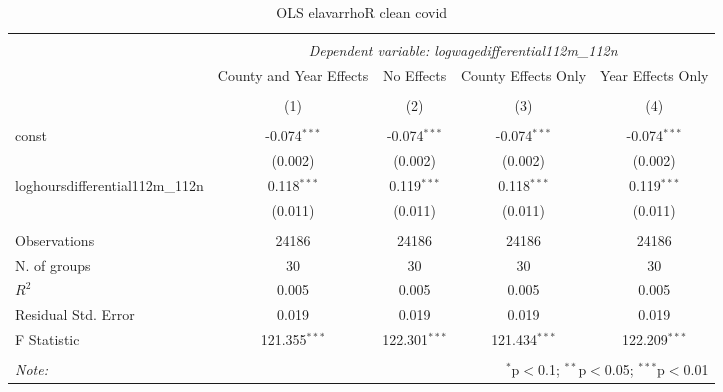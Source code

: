 \documentclass{report}
\begin{document}
\begin{table}[!htbp] \centering
  \caption{OLS elavarrhoR clean covid}
\begin{tabular}{@{\extracolsep{5pt}}lcccc}
\\[-1.8ex]\hline
\hline \\[-1.8ex]
& \multicolumn{4}{c}{\textit{Dependent variable: logwagedifferential112m_112n}} \
\cr \cline{2-5}
\\[-1.8ex] & \multicolumn{1}{c}{County and Year Effects} & \multicolumn{1}{c}{No Effects} & \multicolumn{1}{c}{County Effects Only} & \multicolumn{1}{c}{Year Effects Only}  \\
\\[-1.8ex] & (1) & (2) & (3) & (4) \\
\hline \\[-1.8ex]
 const & -0.074$^{***}$ & -0.074$^{***}$ & -0.074$^{***}$ & -0.074$^{***}$ \\
& (0.002) & (0.002) & (0.002) & (0.002) \\
 loghoursdifferential112m_112n & 0.118$^{***}$ & 0.119$^{***}$ & 0.118$^{***}$ & 0.119$^{***}$ \\
& (0.011) & (0.011) & (0.011) & (0.011) \\
\hline \\[-1.8ex]
 Observations & 24186 & 24186 & 24186 & 24186 \\
 N. of groups & 30 & 30 & 30 & 30 \\
 $R^2$ & 0.005 & 0.005 & 0.005 & 0.005 \\
 Residual Std. Error & 0.019 & 0.019 & 0.019 & 0.019 \\
 F Statistic & 121.355$^{***}$ & 122.301$^{***}$ & 121.434$^{***}$ & 122.209$^{***}$ \\
\hline
\hline \\[-1.8ex]
\textit{Note:} & \multicolumn{4}{r}{$^{*}$p$<$0.1; $^{**}$p$<$0.05; $^{***}$p$<$0.01} \\
\end{tabular}
\end{table}
\end{document}
